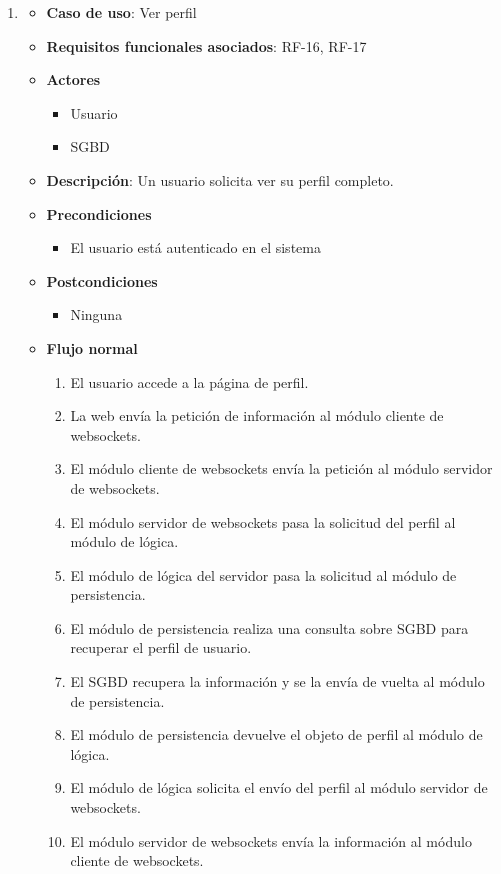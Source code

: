 \begin{enumerate}
\item %
  \begin{itemize}
  \item \textbf{Caso de uso}: Ver perfil
  \item \textbf{Requisitos funcionales asociados}: RF-16, RF-17
  \item \textbf{Actores}
    \begin{itemize}
    \item Usuario
    \item SGBD
    \end{itemize}
  \item \textbf{Descripción}: Un usuario solicita ver su perfil completo.
  \item \textbf{Precondiciones}
    \begin{itemize}
    \item El usuario está autenticado en el sistema
    \end{itemize}
  \item \textbf{Postcondiciones}
    \begin{itemize}
    \item Ninguna
    \end{itemize}
  \item \textbf{Flujo normal}
    \begin{enumerate}
    \item El usuario accede a la página de perfil.
    \item La web envía la petición de información al módulo cliente de websockets.
    \item El módulo cliente de websockets envía la petición al módulo servidor de websockets.
    \item El módulo servidor de websockets pasa la solicitud del perfil al módulo de lógica.
    \item El módulo de lógica del servidor pasa la solicitud al módulo de persistencia.
    \item El módulo de persistencia realiza una consulta sobre SGBD para recuperar el perfil de usuario.
    \item El SGBD recupera la información y se la envía de vuelta al módulo de persistencia.
    \item El módulo de persistencia devuelve el objeto de perfil al módulo de lógica.
    \item El módulo de lógica solicita el envío del perfil al módulo servidor de websockets.
    \item El módulo servidor de websockets envía la información al módulo cliente de websockets.

\end{enumerate}
\end{itemize}
\end{enumerate}
